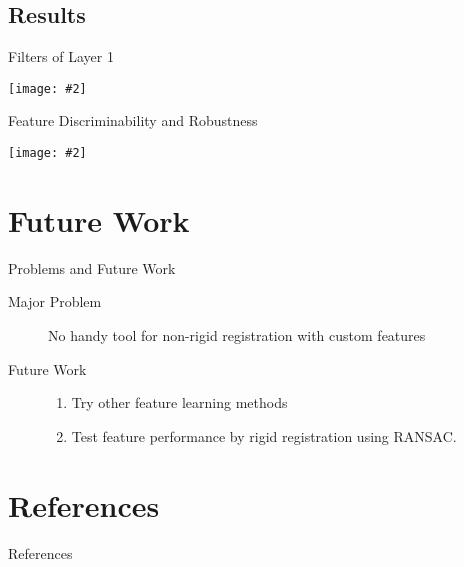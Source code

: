 \documentclass {beamer}
\newcommand{\addgraph}[2]{\begin{center}
\texttt{[image: \#2]}\end{center}}
\begin{document}
\subsection{Results}
\begin{frame}{Filters of Layer 1}
    \addgraph{0.6}{res/filter.png}
\end{frame}

\begin{frame}{Feature Discriminability and Robustness}
    \addgraph{0.7}{res/dist.png}
\end{frame}

\section{Future Work}
\begin{frame}{Problems and Future Work}
    \begin{description}
        \item[Major Problem] No handy tool for non-rigid registration with
            custom features
        \item[Future Work]
            \begin{enumerate}
                \item Try other feature learning methods
                \item Test feature performance by rigid registration using
                    RANSAC.
            \end{enumerate}
    \end{description}
\end{frame}


\section{ }
\subsection{ }

\section[]{References}
\begin{frame}[allowframebreaks]{References}
    \printbibliography
\end{frame}
\end{document}
